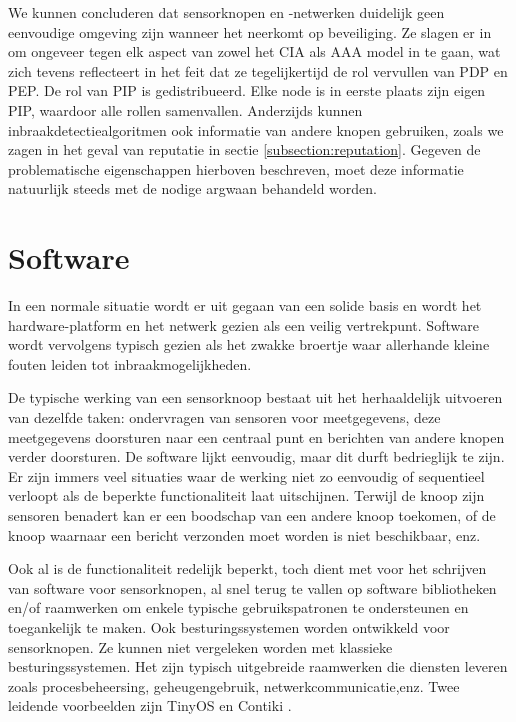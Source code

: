 We kunnen concluderen dat sensorknopen en -netwerken duidelijk geen eenvoudige
omgeving zijn wanneer het neerkomt op beveiliging. Ze slagen er in om ongeveer
tegen elk aspect van zowel het CIA als AAA model in te gaan, wat zich tevens
reflecteert in het feit dat ze tegelijkertijd de rol vervullen van PDP en PEP.
De rol van PIP is gedistribueerd. Elke node is in eerste plaats zijn eigen PIP,
waardoor alle rollen samenvallen. Anderzijds kunnen inbraakdetectiealgoritmen
ook informatie van andere knopen gebruiken, zoals we zagen in het geval van
reputatie in sectie \ref{subsection:reputation}. Gegeven de problematische
eigenschappen hierboven beschreven, moet deze informatie natuurlijk steeds met
de nodige argwaan behandeld worden.

\section{Software}
\label{section:problem-software}

In een normale situatie wordt er uit gegaan van een solide basis en wordt het
hardware-platform en het netwerk gezien als een veilig vertrekpunt. Software
wordt vervolgens typisch gezien als het zwakke broertje waar allerhande kleine
fouten leiden tot inbraakmogelijkheden.

De typische werking van een sensorknoop bestaat uit het herhaaldelijk uitvoeren
van dezelfde taken: ondervragen van sensoren voor meetgegevens, deze
meetgegevens doorsturen naar een centraal punt en berichten van andere knopen
verder doorsturen. De software lijkt eenvoudig, maar dit durft bedrieglijk te
zijn. Er zijn immers veel situaties waar de werking niet zo eenvoudig of
sequentieel verloopt als de beperkte functionaliteit laat uitschijnen. Terwijl
de knoop zijn sensoren benadert kan er een boodschap van een andere knoop
toekomen, of de knoop waarnaar een bericht verzonden moet worden is niet
beschikbaar, enz.

Ook al is de functionaliteit redelijk beperkt, toch dient met voor het
schrijven van software voor sensorknopen, al snel terug te vallen op software
bibliotheken en/of raamwerken om enkele typische gebruikspatronen te
ondersteunen en toegankelijk te maken. Ook besturingssystemen worden ontwikkeld
voor sensorknopen. Ze kunnen niet vergeleken worden met klassieke
besturingssystemen. Het zijn typisch uitgebreide raamwerken die diensten
leveren zoals procesbeheersing, geheugengebruik, netwerkcommunicatie,enz. Twee
leidende voorbeelden zijn TinyOS \citep{levis2005tinyos} en Contiki
\citep{dunkels2004contiki}.

